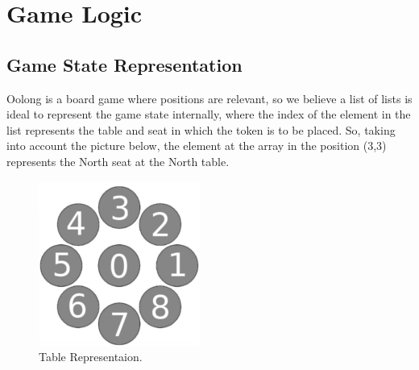 \documentclass[a4paper]{article}
\begin{document}
\section{Game Logic}

\subsection{Game State Representation}
Oolong is a board game where positions are relevant, so we believe a list of lists is ideal
to represent the game state internally, where the index of the element in the list represents the
table and seat in which the token is to be placed. So, taking into account the picture below, the
element at the array in the position (3,3) represents the North seat at the North table.

\begin{figure}[H]
\centering
{}
  \includegraphics[width=\linewidth]{gameboard.png}
  \caption{Table Representaion.}\label{fig:table_rep}
\endminipage\hfill
\end{figure}
\end{document}
